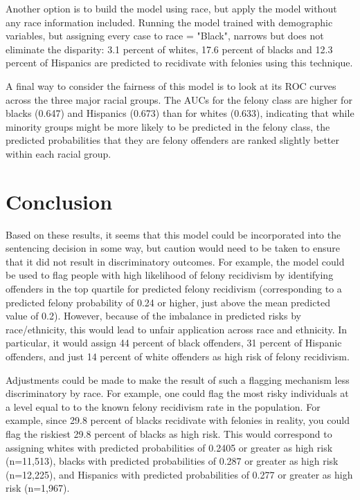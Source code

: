 \documentclass{article}
\begin{document}
Another option is to build the model using race, but apply the model without any race information included. Running the model trained with demographic variables, but assigning every case to race = "Black", narrows but does not eliminate the disparity: 3.1 percent of whites, 17.6 percent of blacks and 12.3 percent of Hispanics are predicted to recidivate with felonies using this technique.

A final way to consider the fairness of this model is to look at its ROC curves across the three major racial groups. The AUCs for the felony class are higher for blacks (0.647) and Hispanics (0.673) than for whites (0.633), indicating that while minority groups might be more likely to be predicted in the felony class, the predicted probabilities that they are felony offenders are ranked slightly better within each racial group. 


\section{Conclusion}

Based on these results, it seems that this model could be incorporated into the sentencing decision in some way, but caution would need to be taken to ensure that it did not result in discriminatory outcomes. For example, the model could be used to flag people with high likelihood of felony recidivism by identifying offenders in the top quartile for predicted felony recidivism (corresponding to a predicted felony probability of 0.24 or higher, just above the mean predicted value of 0.2). However, because of the imbalance in predicted risks by race/ethnicity, this would lead to unfair application across race and ethnicity. In particular, it would assign 44 percent of black offenders, 31 percent of Hispanic offenders, and just 14 percent of white offenders as high risk of felony recidivism. 

Adjustments could be made to make the result of such a flagging mechanism less discriminatory by race. For example, one could flag the most risky individuals at a level equal to to the known felony recidivism rate in the population. For example, since 29.8 percent of blacks recidivate with felonies in reality, you could flag the riskiest 29.8 percent of blacks as high risk. This would correspond to assigning whites with predicted probabilities of 0.2405 or greater as high risk (n=11,513), blacks with predicted probabilities of 0.287 or greater as high risk (n=12,225), and Hispanics with predicted probabilities of 0.277 or greater as high risk (n=1,967).
\end{document}
